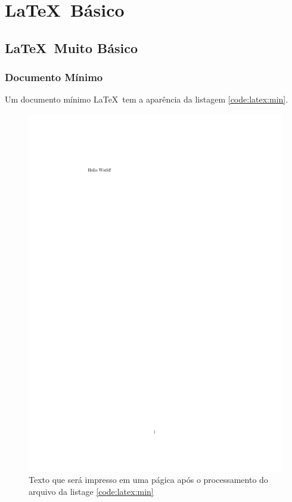 \chapter{\LaTeX\ Básico}

\section{\LaTeX\ Muito Básico}

\subsection{Documento Mínimo}

Um documento mínimo \LaTeX\ tem a aparência da listagem \ref{code:latex:min}. 






\begin{figure}
        \centering
        \includegraphics[clip,trim= 4.8cm 24.5cm 14cm 4.3cm ]{minimo.pdf}
\caption{Texto que será impresso em uma págica após o processamento do arquivo da listage \ref{code:latex:min}}
\label{fig:pdf:min}

\end{figure}

